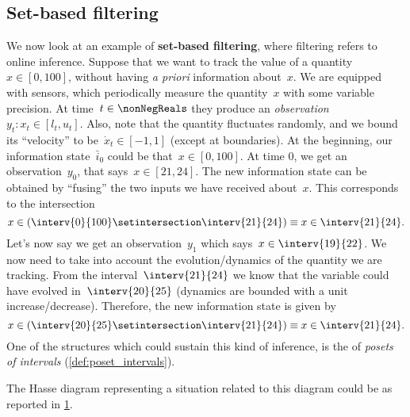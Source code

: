 \subsection{Set-based filtering}
We now look at an example of \textbf{set-based filtering}, where filtering refers to online inference.
Suppose that we want to track the value of a quantity~$x\in [0,100]$, without having \emph{a priori} information about~$x$.
We are equipped with sensors, which periodically measure the quantity~$x$ with some variable precision.
At time~$t\in \nonNegReals $ they produce an \emph{observation}~$y_t\colon x_t\in [l_t,u_t]$.
Also, note that the quantity fluctuates randomly, and we bound its ``velocity'' to be~$\dot{x}_t\in [-1,1]$ (except at boundaries).
At the beginning, our information state~$\bar{i}_0$ could be that~$x\in [0,100]$.
At time 0, we get an observation~$y_0$, that says~$x\in [21,24]$.
The new information state can be obtained by ``fusing'' the two inputs we have received about~$x$.
This corresponds to the intersection
\begin{equation*}
    x\in \left( \interv{0}{100} \setintersection \interv{21}{24}\right)\equiv x\in \interv{21}{24}.
\end{equation*}
Let's now say we get an observation~$y_1$ which says~$x\in \interv{19}{22}$.
We now need to take into account the evolution/dynamics of the quantity we are tracking.
From the interval~$\interv{21}{24}$ we know that the variable could have evolved in~$\interv{20}{25}$ (dynamics are bounded with a unit increase/decrease).
Therefore, the new information state is given by
\begin{equation*}
    x\in \left( \interv{20}{25} \setintersection \interv{21}{24}\right)\equiv x\in \interv{21}{24}.
\end{equation*}
One of the structures which could sustain this kind of inference, is the of \emph{posets of intervals} (\cref{def:poset_intervals}).

The Hasse diagram representing a situation related to this diagram could be as reported in \cref{fig:hasse_filtering}.
\begin{figure}[h!]
    \centering
    \caption{}
    \label{fig:hasse_filtering}
\end{figure}
